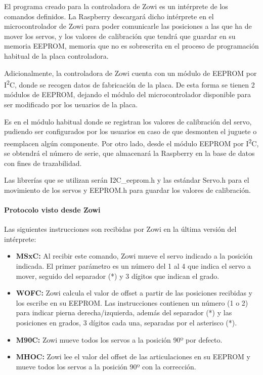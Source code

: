 El programa creado para la controladora de Zowi es un intérprete de los comandos definidos. La Raspberry descargará dicho intérprete en el microcontrolador de Zowi para poder comunicarle las posiciones a las que ha de mover los servos, y los valores de calibración que tendrá que guardar en su memoria EEPROM, memoria que no es sobrescrita en el proceso de programación habitual de la placa controladora.

Adicionalmente, la controladora de Zowi cuenta con un módulo de EEPROM por I\textsuperscript{2}C, donde se recogen datos de fabricación de la placa. De esta forma se tienen 2 módulos de EEPROM, dejando el módulo del microcontrolador disponible para ser modificado por los usuarios de la placa.

Es en el módulo habitual donde se registran los valores de calibración del servo, pudiendo ser configurados por los usuarios en caso de que desmonten el juguete o reemplacen algún componente. Por otro lado, desde el módulo EEPROM por I\textsuperscript{2}C, se obtendrá el número de serie, que almacenará la Raspberry en la base de datos con fines de trazabilidad.

Las librerías que se utilizan serán I2C\_eeprom.h y las estándar Servo.h para el movimiento de los servos y EEPROM.h para guardar los valores de calibración.

\paragraph{Protocolo visto desde Zowi}

Las siguientes instrucciones son recibidas por Zowi en la última versión del intérprete:

\begin{itemize}
  \item \textbf{MSxC:} Al recibir este comando, Zowi mueve el servo indicado a la posición indicada. El primer parámetro es un número del 1 al 4 que indica el servo a mover, seguido del separador (*) y 3 dígitos que indican el grado.
  \item \textbf{WOFC:} Zowi calcula el valor de offset a partir de las posiciones recibidas y los escribe en su EEPROM. Las instrucciones contienen un número (1 o 2) para indicar pierna derecha/izquierda, además del separador (*) y las posiciones en grados, 3 dígitos cada una, separadas por el asterisco (*).
  \item \textbf{M90C:} Zowi mueve todos los servos a la posición 90º por defecto.
  \item \textbf{MHOC:} Zowi lee el valor del offset de las articulaciones en su EEPROM y mueve todos los servos a la posición 90º con la corrección.
\end{itemize}

